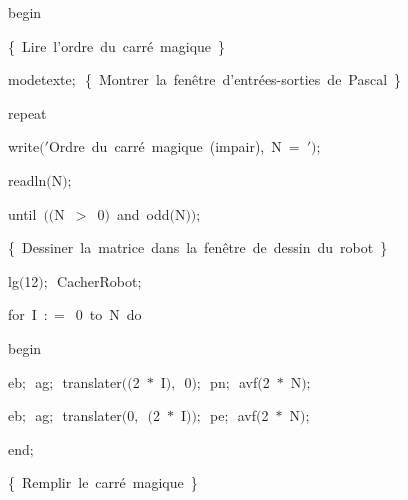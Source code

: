 {\vspace{\neglskip}\mbox{\blc  \idt  \mcl begin\idt }\par 
\vspace{\neglskip}\mbox{\blc  \blk\idt  \cmt  \{\ Lire\ l{'}ordre\ du\ carré\ magique\ \}\idt }\par 
\vspace{\neglskip}\mbox{\blc  \blk\idt  modetexte$;$\ \cmt  \{\ Montrer\ la\ fenêtre\ d{'}entrées-sorties\ de\ Pascal\ \}\idt }\par 
\pagebreak[3] 
\vspace{\neglskip}\mbox{\blc  \blk\idt  \mcl repeat\idt }\par 
\vspace{\neglskip}\mbox{\blc  \blk\blk\idt  write$($\cha $\scriptstyle '$Ordre\ du\ carré\ magique\ (impair),\ N\ =\ \idt $\scriptstyle '$$)$$;$}\par 
\vspace{\neglskip}\mbox{\blc  \blk\blk\idt  readln$($N$)$$;$}\par 
\vspace{\neglskip}\mbox{\blc  \blk\idt  \mcl until\idt \ $($$($N\ $>$\ 0$)$\ \mcl and\idt \ odd$($N$)$$)$$;$}\par 
\vspace{\neglskip}\mbox{\blc  \blk\idt  \cmt  \{\ Dessiner\ la\ matrice\ dans\ la\ fenêtre\ de\ dessin\ du\ robot\ \}\idt }\par 
\vspace{\neglskip}\mbox{\blc  \blk\idt  lg$($12$)$$;$\ CacherRobot$;$}\par 
\pagebreak[3] 
\vspace{\neglskip}\mbox{\blc  \blk\idt  \mcl for\idt \ I\ $:$$=$\ 0\ \mcl to\idt \ N\ \mcl do\idt }\par 
\vspace{\neglskip}\mbox{\blc  \blk\blk\idt  \mcl begin\idt }\par 
\vspace{\neglskip}\mbox{\blc  \blk\blk\blk\idt  eb$;$\ ag$;$\ translater$($$($2\ $\ast$\ I$)$$,$\ 0$)$$;$\ pn$;$\ avf$($2\ $\ast$\ N$)$$;$}\par 
\vspace{\neglskip}\mbox{\blc  \blk\blk\blk\idt  eb$;$\ ag$;$\ translater$($0$,$\ $($2\ $\ast$\ I$)$$)$$;$\ pe$;$\ avf$($2\ $\ast$\ N$)$$;$}\par 
\vspace{\neglskip}\mbox{\blc  \blk\blk\idt  \mcl end\idt $;$\ }\par 
\vspace{\neglskip}\mbox{\blc  \blk\blk\idt  \cmt  \{\ Remplir\ le\ carré\ magique\ \}\idt }\par 
}
